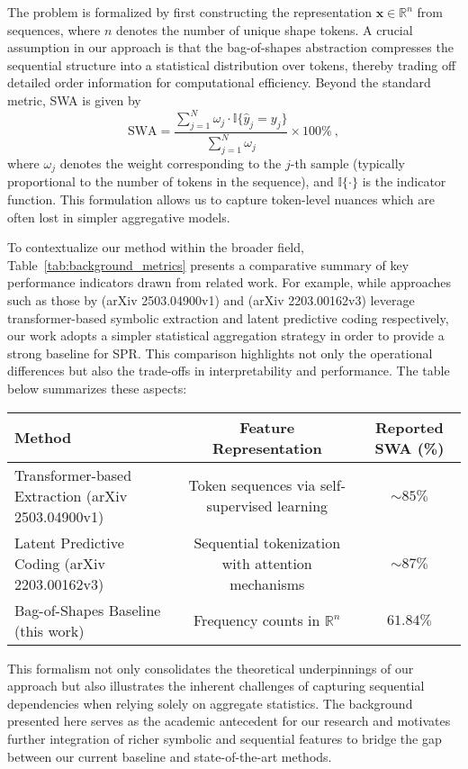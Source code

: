 \documentclass{article}
\begin{document}
The problem is formalized by first constructing the representation \(\boldsymbol{x} \in \mathbb{R}^{n}\) from sequences, where \(n\) denotes the number of unique shape tokens. A crucial assumption in our approach is that the bag-of-shapes abstraction compresses the sequential structure into a statistical distribution over tokens, thereby trading off detailed order information for computational efficiency. Beyond the standard metric, SWA is given by
\[
\text{SWA} = \frac{\sum_{j=1}^{N} \omega_j \cdot \mathbb{I}\{ \hat{y}_j = y_j \}}{\sum_{j=1}^{N} \omega_j} \times 100\%\ ,
\]
where \(\omega_j\) denotes the weight corresponding to the \(j\)-th sample (typically proportional to the number of tokens in the sequence), and \(\mathbb{I}\{\cdot\}\) is the indicator function. This formulation allows us to capture token-level nuances which are often lost in simpler aggregative models.

To contextualize our method within the broader field, Table~\ref{tab:background_metrics} presents a comparative summary of key performance indicators drawn from related work. For example, while approaches such as those by (arXiv 2503.04900v1) and (arXiv 2203.00162v3) leverage transformer-based symbolic extraction and latent predictive coding respectively, our work adopts a simpler statistical aggregation strategy in order to provide a strong baseline for SPR. This comparison highlights not only the operational differences but also the trade-offs in interpretability and performance. The table below summarizes these aspects:

\begin{tabular}{l|c|c}
\textbf{Method} & \textbf{Feature Representation} & \textbf{Reported SWA (\%)} \\
\hline
Transformer-based Extraction (arXiv 2503.04900v1) & Token sequences via self-supervised learning & \(\sim85\%\) \\
Latent Predictive Coding (arXiv 2203.00162v3) & Sequential tokenization with attention mechanisms & \(\sim87\%\) \\
Bag-of-Shapes Baseline (this work) & Frequency counts in \(\mathbb{R}^{n}\) & \(61.84\%\) \\
\end{tabular}

This formalism not only consolidates the theoretical underpinnings of our approach but also illustrates the inherent challenges of capturing sequential dependencies when relying solely on aggregate statistics. The background presented here serves as the academic antecedent for our research and motivates further integration of richer symbolic and sequential features to bridge the gap between our current baseline and state-of-the-art methods.
\end{document}
